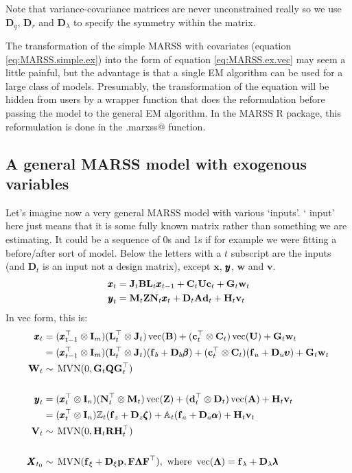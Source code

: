 \documentclass[]{article}
\def\uupsilon{\pmb{\upsilon}}
\def\llambda{\pmb{\lambda}}
\def\bbeta{\pmb{\beta}}
\def\aalpha{\pmb{\alpha}}
\def\zzeta{\pmb{\zeta}}
\def\PI{\mbox{\boldmath $\Pi$}}
\def\LAM{\mbox{\boldmath $\Lambda$}}
\def\UPS{\mbox{\boldmath $\Upsilon$}}
\def\XI{\mbox{\boldmath $\Xi$}}
\def\AA{\mbox{$\mathbf A$}}	\def\aa{\mbox{$\mathbf a$}}
\def\Ab{\mbox{$\mathbf D$}} \def\Aa{\mbox{$\mathbf d$}} \def\Am{\PI}
\def\BB{\mbox{$\mathbf B$}}	\def\bb{\mbox{$\mathbf b$}} \def\Bb{\mbox{$\mathbf J$}} \def\Ba{\mbox{$\mathbf L$}} \def\Bm{\UPS}
\def\DD{\mbox{$\mathbf D$}}	\def\dd{\mbox{$\mathbf d$}}
\def\FF{\mbox{$\mathbf F$}} \def\ff{\mbox{$\mathbf f$}}
\def\II{\mbox{$\mathbf I$}} \def\ii{\mbox{$\mathbf i$}}
\def\MVN{\,\textup{\textrm{MVN}}}
\def\QQ{\mbox{$\mathbf Q$}}	 \def\qq{\mbox{$\mathbf q$}} \def\Qb{\mbox{$\mathbf G$}}  \def\Qm{\mathbb{Q}}
\def\RR{\mbox{$\mathbf R$}}	 \def\rr{\mbox{$\mathbf r$}} \def\Rb{\mbox{$\mathbf H$}}	\def\Rm{\mathbb{R}}
\def\UU{\mbox{$\mathbf U$}}	\def\uu{\mbox{$\mathbf u$}}
\def\Ub{\mbox{$\mathbf C$}} \def\Ua{\mbox{$\mathbf c$}} \def\Um{\UPS}
\def\VV{\mbox{$\mathbf V$}}	\def\vv{\mbox{$\mathbf v$}}
\def\WW{\mbox{$\mathbf W$}}	\def\ww{\mbox{$\mathbf w$}}
\def\XX{\mbox{$\pmb{X}$}}	\def\xx{\mbox{$\pmb{x}$}}
\def\ZZ{\mbox{$\mathbf Z$}}	\def\zz{\mbox{$\mathbf z$}}	\def\Zb{\mbox{$\mathbf M$}} \def\Za{\mbox{$\mathbf N$}} \def\Zm{\XI}
\def\vec{\,\textup{\textrm{vec}}}
\begin{document}
Note that variance-covariance matrices are never unconstrained really so we use $\DD_q$, $\DD_r$ and $\DD_\lambda$ to specify the symmetry within the matrix.

The transformation of the simple MARSS with covariates (equation \ref{eq:MARSS.simple.ex}) into the form of equation \ref{eq:MARSS.ex.vec} may seem a little painful, but the advantage is that a single  EM algorithm can be used for a large class of models.  Presumably, the transformation of the equation will be hidden from users by a wrapper function that does the reformulation before passing the model to the general EM algorithm.  In the MARSS R package, this reformulation is done in the \verb@MARSS.marxss@ function.

\subsection{A general MARSS model with exogenous variables}
Let's imagine now a very general MARSS model with various `inputs'.  `
input' here just means that it is some fully known matrix rather than something we are estimating.  It could be a sequence of 0s and 1s if for example we were fitting a before/after sort of model.  Below the letters with a $t$ subscript are the inputs (and $\Ab_t$ is an input not a design matrix), except $\xx$, $\mbox{$\pmb{y}$}$, $\ww$ and $\vv$.
\begin{equation}\label{eq:MARSS.general.ex}
\begin{split}
\xx_t &= \Bb_t\BB\Ba_t\xx_{t-1} + \Ub_t\UU\Ua_t + \Qb_t\ww_t\\
\yy_t &= \Zb_t\ZZ\Za_t\xx_t + \Ab_t\AA\Aa_t + \Rb_t\vv_t 
\end{split}
\end{equation}
In vec form, this is:
\begin{equation}\label{eq:MARSS.ex3}
\begin{split}
\xx_t &= (\xx_{t-1}^\top \otimes \II_m)(\Ba_t^\top \otimes \Bb_t)\vec(\BB) + (\Ua_t^\top \otimes \Ub_t)\vec(\UU)
+ \Qb_t\ww_t\\
&= (\xx_{t-1}^\top \otimes \II_m)(\Ba_t^\top \otimes \Bb_t)(\ff_b+\DD_b\bbeta) + (\Ua_t^\top \otimes \Ub_t)(\ff_u + \DD_u\uupsilon) + \Qb_t\ww_t\\
\WW_t & \sim \MVN(0,\Qb_t\QQ\Qb_t^\top)\\
\\ 
\yy_t &= (\xx_t^\top \otimes \II_n)(\Za_t^\top \otimes \Zb_t)\vec(\ZZ) + (\Aa_t^\top \otimes \Ab_t)\vec(\AA) + \Rb_t\vv_t \\
&= (\xx_t^\top \otimes \II_n)\mathbb{Z}_t(\ff_z+\DD_z\zzeta) + \mathbb{A}_t(\ff_a+\DD_a\aalpha) + \Rb_t\vv_t \\
\VV_t &\sim \MVN(0,\Rb_t\RR\Rb_t^\top)\\
\\
\XX_{t_0} &\sim \MVN(\ff_\xi+\DD_\xi\pp,\FF\LAM\FF^\top), \text{ where } \vec(\LAM)=\ff_\lambda+\DD_\lambda\llambda
\end{split}
\end{equation}
\end{document}
